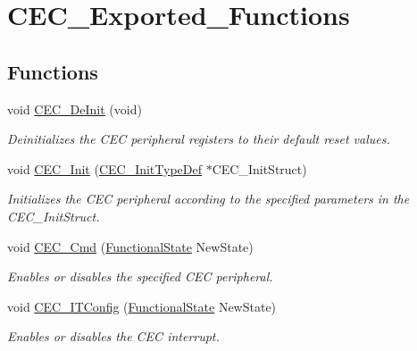 \hypertarget{group___c_e_c___exported___functions}{}\section{C\+E\+C\+\_\+\+Exported\+\_\+\+Functions}
\label{group___c_e_c___exported___functions}
\subsection*{Functions}
\begin{DoxyCompactItemize}
\item 
void \mbox{\hyperlink{group___c_e_c___exported___functions_ga604c3b15b51a46303c201fa3deac2212}{C\+E\+C\+\_\+\+De\+Init}} (void)
\begin{DoxyCompactList}\small\item\em Deinitializes the C\+EC peripheral registers to their default reset values. \end{DoxyCompactList}\item 
void \mbox{\hyperlink{group___c_e_c___exported___functions_gaf48aee745a16370372b3eaa7cf3ed22b}{C\+E\+C\+\_\+\+Init}} (\mbox{\hyperlink{struct_c_e_c___init_type_def}{C\+E\+C\+\_\+\+Init\+Type\+Def}} $\ast$C\+E\+C\+\_\+\+Init\+Struct)
\begin{DoxyCompactList}\small\item\em Initializes the C\+EC peripheral according to the specified parameters in the C\+E\+C\+\_\+\+Init\+Struct. \end{DoxyCompactList}\item 
void \mbox{\hyperlink{group___c_e_c___exported___functions_ga0c8efa79e5768930e567b3b3ed6e09e9}{C\+E\+C\+\_\+\+Cmd}} (\mbox{\hyperlink{group___exported__types_gac9a7e9a35d2513ec15c3b537aaa4fba1}{Functional\+State}} New\+State)
\begin{DoxyCompactList}\small\item\em Enables or disables the specified C\+EC peripheral. \end{DoxyCompactList}\item 
void \mbox{\hyperlink{group___c_e_c___exported___functions_ga8be87c514505cf82eb29334f054fc0bc}{C\+E\+C\+\_\+\+I\+T\+Config}} (\mbox{\hyperlink{group___exported__types_gac9a7e9a35d2513ec15c3b537aaa4fba1}{Functional\+State}} New\+State)
\begin{DoxyCompactList}\small\item\em Enables or disables the C\+EC interrupt. \end{DoxyCompactList}\item 

\end{DoxyCompactItemize}
